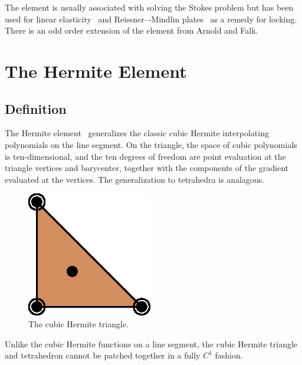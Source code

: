 
The element is usually associated with solving the Stokes problem but
has been used for linear elasticity~\cite{HansboLarson2003} and
Reissner–-Mindlin plates~\cite{ArnoldFalk1989} as a remedy for
locking. There is an odd order extension of the element from Arnold
and Falk.


\newpage

\section{The Hermite Element}

\subsection{Definition}

The Hermite element~\cite{Ciarlet2002} generalizes the classic cubic
Hermite interpolating polynomials on the line segment. On the
triangle, the space of cubic polynomials is ten-dimensional, and the
ten degrees of freedom are point evaluation at the triangle vertices
and barycenter, together with the components of the gradient evaluated
at the vertices. The generalization to tetrahedra is analagous.

\begin{figure}[H]
  \begin{center}
    \includegraphics[width=\elementwidth]{chapters/kirby-6/eps/HER3.eps}
    \caption{The cubic Hermite triangle.}
  \end{center}
\end{figure}

Unlike the cubic Hermite functions on a line segment, the cubic
Hermite triangle and tetrahedron cannot be patched together in a fully
\( C^1 \) fashion.

